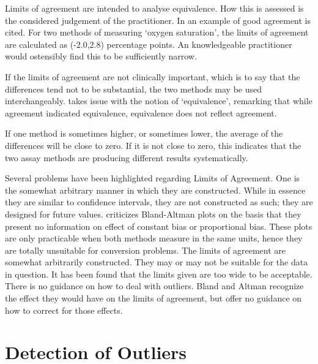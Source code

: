 \documentclass[12pt, a4paper]{report}
\theoremstyle{plain}
\theoremstyle{definition}
\theoremstyle{remark}
\begin{document}
	Limits of agreement are intended to analyse equivalence. How this is assessed is the considered judgement of the practitioner. In \citet{BA86} an example of good agreement is cited. For two
	methods of measuring `oxygen saturation', the limits of agreement are calculated as (-2.0,2.8) percentage points. An knowledgeable practitioner would ostensibly find
	this to be sufficiently narrow.
	
	If the limits of agreement are not clinically important, which is
	to say that the differences tend not to be substantial, the two
	methods may be used interchangeably. \citet{DunnSEME} takes issue
	with the notion of `equivalence', remarking that while agreement
	indicated equivalence, equivalence does not reflect agreement.
	
	
	
	If one method is sometimes higher, or sometimes lower, the average of the differences will be close to zero.
	If it is not close to zero, this indicates that the two assay methods are producing different results systematically.
	
	Several problems have been highlighted regarding Limits of Agreement. One is the somewhat arbitrary manner in which they are
	constructed. While in essence they are similar to confidence intervals, they are not constructed as such; they are designed for future values.
	\citet{ludbrook97,ludbrook02} criticizes Bland-Altman plots on the
	basis that they present no information on effect of constant bias
	or proportional bias. These plots are only practicable when both
	methods measure in the same units, hence they are totally
	unsuitable for conversion problems. The limits of agreement are
	somewhat arbitrarily constructed. They may or may not be suitable
	for the data in question. It has been found that the limits given
	are too wide to be acceptable. There is no guidance on how to deal
	with outliers. Bland and Altman recognize the effect they would have
	on the limits of agreement, but offer no guidance on how to
	correct for those effects.	
	
	
	\section{Detection of Outliers}
	
\end{document}

